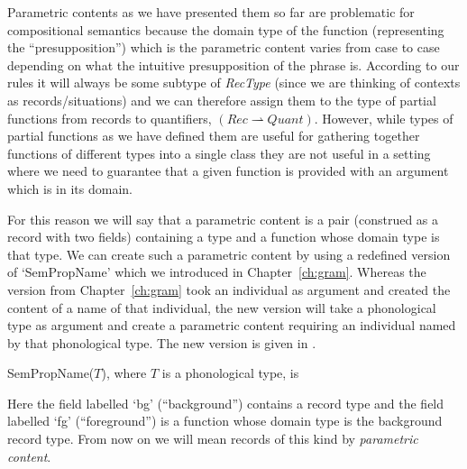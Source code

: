 Parametric contents as we have presented them so far are problematic
for compositional semantics because the domain type of the
function (representing the ``presupposition'') which is the parametric
content varies from case to case depending on what the intuitive
presupposition of the phrase is.  According to our rules it will
always be some subtype of \textit{RecType} (since we are thinking of
contexts as records/situations) and we can therefore assign them to
the type of partial functions from records to quantifiers,
$(\textit{Rec}\rightharpoonup\textit{Quant})$. However, while types of
partial functions as we have defined them are useful for gathering together functions of
different types into a single class they are not useful in a setting
where we need to guarantee that a given function is provided with an
argument which is in its domain.

For this reason we will say that a parametric content is a pair
(construed as a record with two fields) containing a type and a
function whose domain type is that type.  We can create such a
parametric content by using a redefined version of `SemPropName' which
we introduced in Chapter~\ref{ch:gram}.  Whereas the version from
Chapter~\ref{ch:gram} took an individual as argument and created the
content of a name of that individual, the new version will take a
phonological type as argument and create a parametric content
requiring an individual named by that phonological type.  The new
version is given in \nexteg{}.
\begin{ex} 
SemPropName($T$), where $T$ is a phonological type,
is

\label{ex:SemPropName-chpropnames} 
\end{ex}
Here the field labelled `bg' (``background'') contains a record type
and the field labelled `fg' (``foreground'') is a function whose
domain type is the background record type.  From now on we will mean
records of this kind by \textit{parametric content}.

